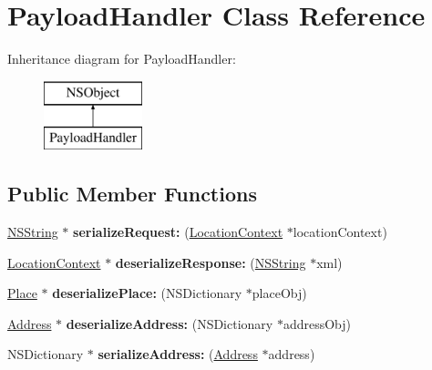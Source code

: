 \hypertarget{interface_payload_handler}{
\section{\-Payload\-Handler \-Class \-Reference}
\label{interface_payload_handler}
}
\-Inheritance diagram for \-Payload\-Handler\-:\begin{figure}[H]
\begin{center}
\leavevmode
\includegraphics[height=2.000000cm]{interface_payload_handler}
\end{center}
\end{figure}
\subsection*{\-Public \-Member \-Functions}
\begin{DoxyCompactItemize}
\item 
\hypertarget{interface_payload_handler_aae7823911df4810cfcad6d492399d10b}{
\hyperlink{class_n_s_string}{\-N\-S\-String} $\ast$ {\bfseries serialize\-Request\-:} (\hyperlink{interface_location_context}{\-Location\-Context} $\ast$location\-Context)}
\label{interface_payload_handler_aae7823911df4810cfcad6d492399d10b}

\item 
\hypertarget{interface_payload_handler_afe934ee604d56ecb57fbfc8daf701c16}{
\hyperlink{interface_location_context}{\-Location\-Context} $\ast$ {\bfseries deserialize\-Response\-:} (\hyperlink{class_n_s_string}{\-N\-S\-String} $\ast$xml)}
\label{interface_payload_handler_afe934ee604d56ecb57fbfc8daf701c16}

\item 
\hypertarget{interface_payload_handler_a70ad2aafbaf50649c9b481c88a31fe45}{
\hyperlink{interface_place}{\-Place} $\ast$ {\bfseries deserialize\-Place\-:} (\-N\-S\-Dictionary $\ast$place\-Obj)}
\label{interface_payload_handler_a70ad2aafbaf50649c9b481c88a31fe45}

\item 
\hypertarget{interface_payload_handler_a0285bc55790dd82c21d5ca1c0fc6b9ec}{
\hyperlink{interface_address}{\-Address} $\ast$ {\bfseries deserialize\-Address\-:} (\-N\-S\-Dictionary $\ast$address\-Obj)}
\label{interface_payload_handler_a0285bc55790dd82c21d5ca1c0fc6b9ec}

\item 
\hypertarget{interface_payload_handler_a77b5df6ee5e93902de11add7feb9256e}{
\-N\-S\-Dictionary $\ast$ {\bfseries serialize\-Address\-:} (\hyperlink{interface_address}{\-Address} $\ast$address)}
\label{interface_payload_handler_a77b5df6ee5e93902de11add7feb9256e}

\end{DoxyCompactItemize}
